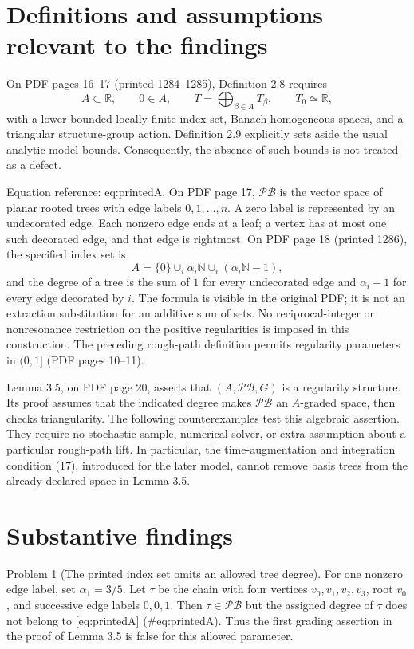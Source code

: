 \documentclass[10pt]{article}
\begin{document}
\section*{Definitions and assumptions relevant to the findings}
On PDF pages 16–17 (printed 1284–1285), Definition 2.8 requires \[A\subset\mathbb R,\qquad 0\in A,\qquad
 T=\bigoplus_{\beta\in A}T_\beta,\qquad T_0\simeq\mathbb R,\] with a lower-bounded locally finite index set, Banach homogeneous spaces, and a triangular structure-group action. Definition 2.9 explicitly sets aside the usual analytic model bounds. Consequently, the absence of such bounds is not treated as a defect.\par
Equation reference: eq:printedA. On PDF page 17, \(\mathcal{PB}\) is the vector space of planar rooted trees with edge labels \(0,1,\ldots,n\). A zero label is represented by an undecorated edge. Each nonzero edge ends at a leaf; a vertex has at most one such decorated edge, and that edge is rightmost. On PDF page 18 (printed 1286), the specified index set is \[
 A=\{0\}\cup_i\alpha_i\mathbb N
       \cup_i(\alpha_i\mathbb N-1),\] and the degree of a tree is the sum of \(1\) for every undecorated edge and \(\alpha_i-1\) for every edge decorated by \(i\). The formula is visible in the original PDF; it is not an extraction substitution for an additive sum of sets. No reciprocal-integer or nonresonance restriction on the positive regularities is imposed in this construction. The preceding rough-path definition permits regularity parameters in \((0,1]\) (PDF pages 10–11).\par
Lemma 3.5, on PDF page 20, asserts that \((A,\mathcal{PB},G)\) is a regularity structure. Its proof assumes that the indicated degree makes \(\mathcal{PB}\) an \(A\)-graded space, then checks triangularity. The following counterexamples test this algebraic assertion. They require no stochastic sample, numerical solver, or extra assumption about a particular rough-path lift. In particular, the time-augmentation and integration condition (17), introduced for the later model, cannot remove basis trees from the already declared space in Lemma 3.5.\par
\section*{Substantive findings}
Problem 1 (The printed index set omits an allowed tree degree).  For one nonzero edge label, set \(\alpha_1=3/5\). Let \(\tau\) be the chain with four vertices \(v_0,v_1,v_2,v_3\), root \(v_0\), and successive edge labels \(0,0,1\). Then \(\tau\in\mathcal{PB}\) but the assigned degree of \(\tau\) does not belong to [eq:printedA] (\#eq:printedA). Thus the first grading assertion in the proof of Lemma 3.5 is false for this allowed parameter.\par
\end{document}
